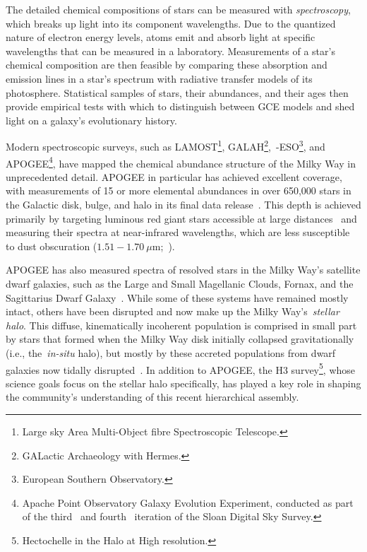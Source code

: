 \documentclass[main.tex]{subfiles}
\begin{document}
\begin{doublespace}
The detailed chemical compositions of stars can be measured with
\textit{spectroscopy}, which breaks up light into its component wavelengths.
Due to the quantized nature of electron energy levels, atoms emit and absorb
light at specific wavelengths that can be measured in a laboratory.
Measurements of a star's chemical composition are then feasible by comparing
these absorption and emission lines in a star's spectrum with radiative
transfer models of its photosphere.
Statistical samples of stars, their abundances, and their ages then provide
empirical tests with which to distinguish between GCE models and shed light on
a galaxy's evolutionary history.
\par
Modern spectroscopic surveys, such as LAMOST\footnote{
	Large sky Area Multi-Object fibre Spectroscopic Telescope.
}\space\citep{Luo2015}, GALAH\footnote{
	GALactic Archaeology with Hermes.
}\space\citep{DeSilva2015, Martell2017},~\gaia-ESO\footnote{
	European Southern Observatory.
}\space\citep{Gilmore2012}, and
APOGEE\footnote{
	Apache Point Observatory Galaxy Evolution Experiment, conducted as part of
	the third~\citep{Eisenstein2011} and fourth~\citep{Blanton2017} iteration
	of the Sloan Digital Sky Survey.
}\space\citep{Majewski2017}, have mapped the chemical abundance structure of
the Milky Way in unprecedented detail.
APOGEE in particular has achieved excellent coverage, with measurements of 15
or more elemental abundances in over 650,000 stars in the Galactic disk, bulge,
and halo in its final data release~\citep{Abdurrouf2022}.
This depth is achieved primarily by targeting luminous red giant stars
accessible at large distances~\citep{Zasowski2013, Zasowski2017, Beaton2021,
Santana2021} and measuring their spectra at near-infrared wavelengths, which
are less susceptible to dust obscuration
($1.51 - 1.70~\mu$m;~\citealp{Wilson2019}).
\par
APOGEE has also measured spectra of resolved stars in the Milky Way's satellite
dwarf galaxies, such as the Large and Small Magellanic Clouds, Fornax, and the
Sagittarius Dwarf Galaxy~\citep[see, e.g.,][]{Hasselquist2021}.
While some of these systems have remained mostly intact, others have been
disrupted and now make up the Milky Way's~\textit{stellar halo}.
This diffuse, kinematically incoherent population is comprised in small part by
stars that formed when the Milky Way disk initially collapsed gravitationally
(i.e., the~\textit{in-situ} halo), but mostly by these accreted populations
from dwarf galaxies now tidally disrupted~\citep[e.g.,][]{Naidu2020}.
In addition to APOGEE, the H3 survey\footnote{
	Hectochelle in the Halo at High resolution.
}\space\citep{Conroy2019}, whose science goals focus on the stellar halo
specifically, has played a key role in shaping the community's understanding of
this recent hierarchical assembly.


\end{doublespace}
\end{document}
